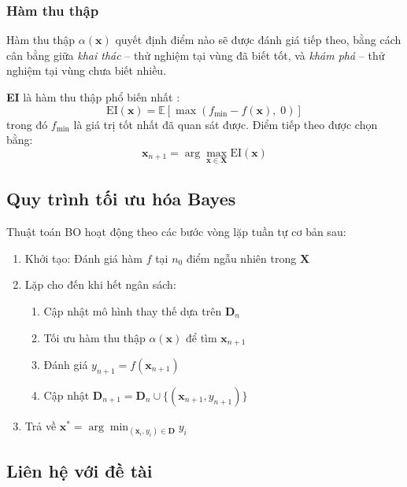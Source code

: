 \subsubsection{Hàm thu thập}

Hàm thu thập $\alpha(\mathbf{x})$ quyết định điểm nào sẽ được đánh giá tiếp theo, bằng cách cân bằng giữa \textit{khai thác} -- thử nghiệm tại vùng đã biết tốt, và \textit{khám phá} -- thử nghiệm tại vùng chưa biết nhiều.

\textbf{EI} là hàm thu thập phổ biến nhất \cite{jones1998ei}:
\begin{equation}
    \text{EI}(\mathbf{x}) = \mathbb{E}\left[\max\left(f_{\min} - f(\mathbf{x}),\; 0\right)\right]
    \label{eq:ei}
\end{equation}
\noindent trong đó $f_{\min}$ là giá trị tốt nhất đã quan sát được. Điểm tiếp theo được chọn bằng:
\begin{equation}
    \mathbf{x}_{n+1} = \arg\max_{\mathbf{x} \in \mathbf{X}} \text{EI}(\mathbf{x})
\end{equation}

\subsection{Quy trình tối ưu hóa Bayes}

Thuật toán BO hoạt động theo các bước vòng lặp tuần tự cơ bản sau:

\begin{enumerate}
    \item Khởi tạo: Đánh giá hàm $f$ tại $n_0$ điểm ngẫu nhiên trong $\mathbf{X}$
    \item Lặp cho đến khi hết ngân sách:
    \begin{enumerate}
        \item Cập nhật mô hình thay thế dựa trên $\mathbf{D}_n$
        \item Tối ưu hàm thu thập $\alpha(\mathbf{x})$ để tìm $\mathbf{x}_{n+1}$
        \item Đánh giá $y_{n+1} = f(\mathbf{x}_{n+1})$
        \item Cập nhật $\mathbf{D}_{n+1} = \mathbf{D}_n \cup \{(\mathbf{x}_{n+1}, y_{n+1})\}$
    \end{enumerate}
    \item Trả về $\mathbf{x}^* = \arg\min_{(\mathbf{x}_i, y_i) \in \mathbf{D}} y_i$
\end{enumerate}

\iffalse
\subsection{Liên hệ với đề tài}

